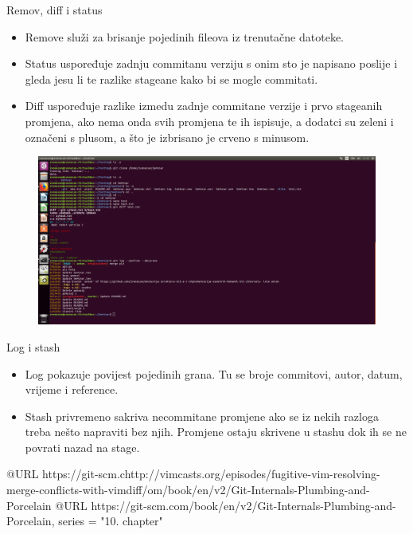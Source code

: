 \documentclass{beamer}
\begin{document}
\begin{frame}{Remov, diff i status}
	\begin{itemize}
	\item Remove služi za brisanje pojedinih fileova iz trenutačne datoteke.
	\item Status uspoređuje zadnju commitanu verziju s onim sto je napisano poslije i gleda jesu li te razlike stageane kako bi se mogle commitati.
	\item Diff uspoređuje razlike izmedu zadnje commitane verzije i prvo stageanih promjena, ako nema onda svih promjena te ih ispisuje, a dodatci su zeleni i označeni s plusom, a što je izbrisano je crveno s minusom.
	\end{itemize}
\end{frame}
\begin{frame}
\begin{figure}
\includegraphics[width=1\textwidth]{./slike/c.png}
\end{figure}
\end{frame}
\begin{frame}{Log i stash}
	\begin{itemize}
	\item Log pokazuje povijest pojedinih grana. Tu se broje commitovi, autor, datum, vrijeme i reference.
	\item Stash privremeno sakriva necommitane promjene ako se iz nekih razloga treba nešto napraviti bez njih. Promjene ostaju skrivene u stashu dok ih se ne povrati nazad na stage.
	\end{itemize}
\end{frame}
\begin{thebibliography}{}
	
	@URL {https://git-scm.chttp://vimcasts.org/episodes/fugitive-vim-resolving-merge-conflicts-with-vimdiff/om/book/en/v2/Git-Internals-Plumbing-and-Porcelain
}
	@URL {https://git-scm.com/book/en/v2/Git-Internals-Plumbing-and-Porcelain,
    series = "10. chapter"
}

\end{thebibliography}
\end{document}
